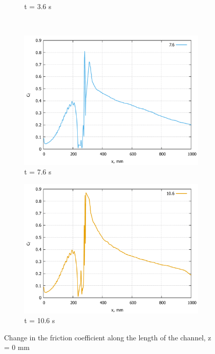 \begin{figure}[H]
\begin{subfigure}{.5\textwidth}
			\caption{t = 3.6 s}
			\label{fig:Cf-T360}
		\end{subfigure}
		\\
		\begin{subfigure}{.5\textwidth}
			\centering
			\includegraphics[width=1\linewidth]{../Assets/Cf-T760}
			\caption{t = 7.6 s}
			\label{fig:Cf-T760}
		\end{subfigure}%
		\begin{subfigure}{.5\textwidth}
			\centering
			\includegraphics[width=1\linewidth]{../Assets/Cf-T1060}
			\caption{t = 10.6 s}
			\label{fig:Cf-T1060}
		\end{subfigure}
		\caption{Change in the friction coefficient along the length of the channel, z = 0 mm}
		\label{fig:cf}
	\end{figure}
